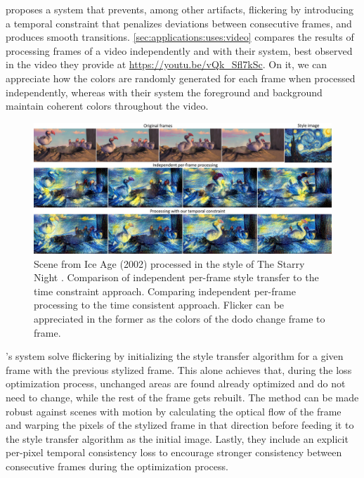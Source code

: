 \citet{Ruder2016} proposes a system that prevents, among other artifacts, flickering by introducing a temporal constraint that penalizes deviations between consecutive frames, and produces smooth transitions.
\autoref{sec:applications:uses:video} compares the results of processing frames of a video independently and with their system, best observed in the video they provide at \url{https://youtu.be/vQk_Sfl7kSc}.
On it, we can appreciate how the colors are randomly generated for each frame when processed independently, whereas with their system the foreground and background maintain coherent colors throughout the video.

\begin{figure}[t]
  \includegraphics[width=\textwidth]{gfx/app-neural-video}
  \caption{
    Scene from Ice Age (2002) processed in the style of The Starry Night \cite{Ruder2016}.
    Comparison of independent per-frame style transfer to the time constraint approach.
    Comparing independent per-frame processing to the time consistent approach.
    Flicker can be appreciated in the former as the colors of the dodo change frame to frame.
  }
  \label{sec:applications:uses:video}
\end{figure}

\citeauthor{Ruder2016}'s system solve flickering by initializing the style transfer algorithm for a given frame with the previous stylized frame.
This alone achieves that, during the loss optimization process, unchanged areas are found already optimized and do not need to change, while the rest of the frame gets rebuilt.
The method can be made robust against scenes with motion by calculating the optical flow of the frame and warping the pixels of the stylized frame in that direction before feeding it to the style transfer algorithm as the initial image.
Lastly, they include an explicit per-pixel temporal consistency loss to encourage stronger consistency between consecutive frames during the optimization process.

